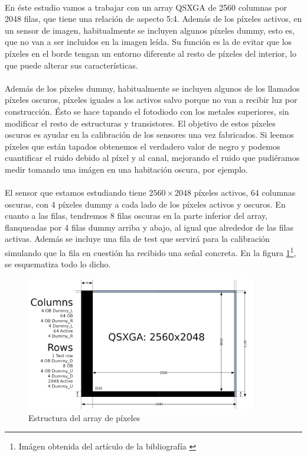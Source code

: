 \paragraph{}
En éste estudio vamos a trabajar con un array QSXGA de 2560 columnas por 2048 filas,
que tiene una relación de aspecto 5:4. Además de los píxeles activos, en un sensor
de imagen, habitualmente se incluyen algunos píxeles dummy, esto es, que no van
a ser incluidos en la imagen leída. Su función es la de evitar que los píxeles
en el borde tengan un entorno diferente al resto de píxeles del interior, lo que
puede alterar sus características.

\paragraph{}
Además de los píxeles dummy, habitualmente se incluyen algunos de los llamados
píxeles oscuros, píxeles iguales a los activos salvo porque no van a recibir luz
por construcción. Ésto se hace tapando el fotodiodo con los metales superiores,
sin modificar el resto de estructuras y transistores. El objetivo de estos píxeles
oscuros es ayudar en la calibración de los sensores una vez fabricados. Si
leemos píxeles que están tapados obtenemos el verdadero valor de negro y podemos
cuantificar el ruido debido al píxel y al canal, mejorando el ruido
que pudiéramos medir tomando una imágen en una habitación oscura, por ejemplo.

\paragraph{}
El sensor que estamos estudiando tiene $2560\times2048$ píxeles activos, 64 columnas
oscuras, con 4 píxeles dummy a cada lado de los píxeles activos y oscuros.
En cuanto a las filas, tendremos 8 filas oscuras en la parte inferior del array,
flanqueadas por 4 filas dummy arriba y abajo, al igual que alrededor de las filas
activas. Además se incluye una fila de test que servirá para la calibración simulando
que la fila en cuestión ha recibido una señal concreta. En la figura
\ref{fig:pxa_array}\footnote{Imágen obtenida del artículo de la bibliografía \cite{Jimenez-Garrido2012}},
se esquematiza todo lo dicho.

\begin{figure}
	\centering
	\includegraphics[width=0.9\textwidth]{img/pixel_array.png}
	\caption{Estructura del array de píxeles}
	\label{fig:pxa_array}
\end{figure}

